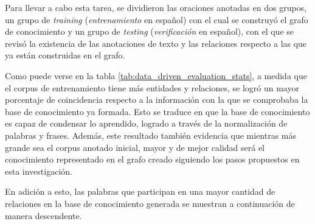 Para llevar a cabo esta tarea, se dividieron las oraciones anotadas en dos grupos, un grupo de \textit{training} (\textit{entrenamiento} en español) con el cual se construyó el grafo de conocimiento y un grupo de \textit{testing} (\textit{verificación} en español), con el que se revisó la existencia de las anotaciones de texto y las relaciones respecto a las que ya están construidas en el grafo.

Como puede verse en la tabla \ref{tab:data_driven_evaluation_stats}, a medida que el corpus de entrenamiento tiene más entidades y relaciones, se logró un mayor porcentaje de coincidencia respecto a la información con la que se comprobaba la base de conocimiento ya formada. Esto se traduce en que la base de conocimiento es capaz de condensar lo aprendido, logrado a través de la normalización de palabras y frases. Además, este resultado también evidencia que mientras más grande sea el corpus anotado inicial, mayor y de mejor calidad será el conocimiento representado en el grafo creado siguiendo los pasos propuestos en esta investigación.

En adición a esto, las palabras que participan en una mayor cantidad de relaciones en la base de conocimiento generada se muestran a continuación de manera descendente.

